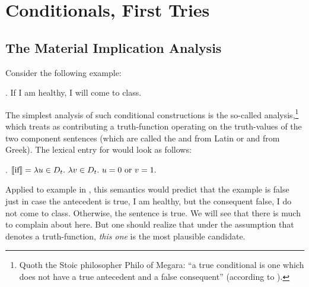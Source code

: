\chapter{Conditionals, First Tries}\label{cha:conditionals-first} %


\minitoc

\section{The Material Implication Analysis}

Consider the following example:

\ex. If I am healthy, I will come to class.

The simplest analysis of such conditional constructions is the so-called  analysis,\footnote{Quoth the Stoic philosopher Philo of Megara: ``a true conditional is one which does not have a true antecedent and a false consequent'' (according to \citet[II, 110--112]{sextus-empiricus:200:outlines}).} which treats  as contributing a truth-function operating on the truth-values of the two component sentences (which are called the  and  \dash from Latin \dash or  and  \dash from Greek). The lexical entry for  would look as follows:

\ex.\label{ex:material} $\llbracket \mbox{if} \rrbracket = \lambda u \in D_t.\ \lambda v \in D_t.\ u=0 \mbox{ or } v=1.$

Applied to example in \LLast, this semantics would predict that the example is false just in case the antecedent is true, I am healthy, but the consequent false, I do not come to class. Otherwise, the sentence is true. We will see that there is much to complain about here. But one should realize that under the assumption that  denotes a truth-function, \emph{this one} is the most plausible candidate.

